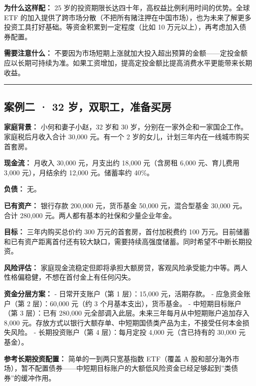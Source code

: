 \documentclass[a4paper,11pt,oneside,fontset=none,UTF8,zihao=-4]{ctexbook}
\begin{document}
\textbf{为什么这样配：} 25
岁的投资期限长达四十年，高权益比例利用时间的优势。全球 ETF
的加入提供了跨市场分散（不把所有赌注押在中国市场），也为未来了解更多投资工具打好基础。等资金积累到一定程度（比如
10 万元以上），再考虑加入债券配置。

\textbf{需要注意什么：}
不要因为市场短期上涨就加大投入超出预算的金额------定投金额应以长期可持续为准。如果工资增加，提高定投金额比提高消费水平更能带来长期收益。

\begin{center}{\color{dh-bronze}\rule{0.2\textwidth}{0.5pt}}\end{center}

\subsection{案例二 · 32
岁，双职工，准备买房}\label{ux6848ux4f8bux4e8c-32-ux5c81ux53ccux804cux5de5ux51c6ux5907ux4e70ux623f}

\textbf{家庭背景：} 小何和妻子小赵，32 岁和 30
岁，分别在一家外企和一家国企工作。家庭税后月收入合计 30,000 元。有一个 2
岁的女儿，计划三年内在一线城市购买首套房。

\textbf{现金流：} 月收入 30,000 元，月支出约 18,000 元（含房租 6,000
元、育儿费用 3,000 元），月结余约 12,000 元。储蓄率约 40\%。

\textbf{负债：} 无。

\textbf{已有资产：} 银行存款 200,000 元，货币基金 50,000 元，混合型基金
30,000 元。合计 280,000 元。两人都有基本的社保和少量企业年金。

\textbf{目标：} 三年内购买总价约 300 万元的首套房，首付加税费约 100
万元。目前储蓄和已有资产距离首付还有较大缺口，需要持续高强度储蓄。同时希望不中断长期投资。

\textbf{风险评估：}
家庭现金流稳定但即将承担大额房贷，客观风险承受能力中等。两人性格偏稳健，不想在首付金上有任何闪失。

\textbf{资金分层方案：} - 日常开支账户（第 1 层）：15,000 元，活期存款。
- 应急资金账户（第 2 层）：60,000 元（约 3 个月基本支出），货币基金。 -
中短期目标账户（第 3 层）：已有 280,000
元全部调入此层。未来三年每月从中短期账户追加存入 8,000
元。存放方式以银行大额存单、中短期国债类产品为主，不接受任何本金损失风险。
- 长期投资账户（第 4 层）：每月定投 4,000 元（含已持有的 30,000
元基金）。

\textbf{参考长期投资配置：} 简单的一到两只宽基指数 ETF（覆盖 A
股和部分海外市场），暂不配置债券------中短期目标账户的大额低风险资金已经足够起到''类债券''的缓冲作用。
\end{document}
